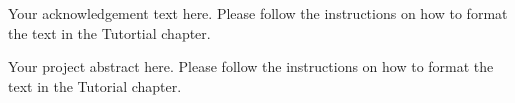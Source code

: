 \documentclass{report}
\begin{document}
\begin{coverpage}
\end{coverpage}

\begin{certificate}
\end{certificate}

\begin{acknowledgement}

        Your acknowledgement text here. Please follow the instructions on how to format the text in the Tutortial chapter.
    
\end{acknowledgement}

\begin{projectAbstract}

        Your project abstract here. Please follow the instructions on how to format the text in the Tutorial chapter.
    
\end{projectAbstract}




\newpage
\tableofcontents
\newpage
\end{document}
